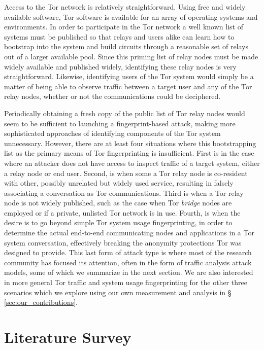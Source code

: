 \documentclass[sigconf]{acmart}
\begin{document}
Access to the Tor network is relatively straightforward.  Using free and
widely available software, Tor software is available for an array of
operating systems and environments.  In order to participate in the Tor
network a well known list of systems must be published so that relays
and users alike can learn how to bootstrap into the system and build
circuits through a reasonable set of relays out of a larger available
pool.  Since this priming list of relay nodes must be made widely
available and published widely, identifying these relay nodes is very
straightforward.  Likewise, identifying users of the Tor system would
simply be a matter of being able to observe traffic between a target
user and any of the Tor relay nodes, whether or not the communications
could be deciphered.

Periodically obtaining a fresh copy of the public list of Tor relay
nodes would seem to be sufficient to launching a fingerprint-based
attack, making more sophisticated approaches of identifying components
of the Tor system unnecessary.  However, there are at least four
situations where this bootstrapping list as the primary means of Tor
fingerprinting is insufficient.  First is in the case where an attacker
does not have access to inspect traffic of a target system, either a
relay node or end user.  Second, is when some a Tor relay node is
co-resident with other, possibly unrelated but widely used service,
resulting in falsely associating a conversation as Tor communications.
Third is when a Tor relay node is not widely published, such as the case
when Tor \emph{bridge} nodes are employed or if a private, unlisted Tor
network is in use.  Fourth, is when the desire is to go beyond simple
Tor system usage fingerprinting, in order to determine the actual
end-to-end communicating nodes and applications in a Tor system
conversation, effectively breaking the anonymity protections Tor was
designed to provide.  This last form of attack type is where most of the
research community has focused its attention, often in the form of
traffic analysis attack models, some of which we summarize in the next
section.  We are also interested in more general Tor traffic and system
usage fingerprinting for the other three scenarios which we explore
using our own measurement and analysis in \S
\ref{sec:our_contributions}.

\section{Literature Survey}\label{sec:literature_survey}
\end{document}
